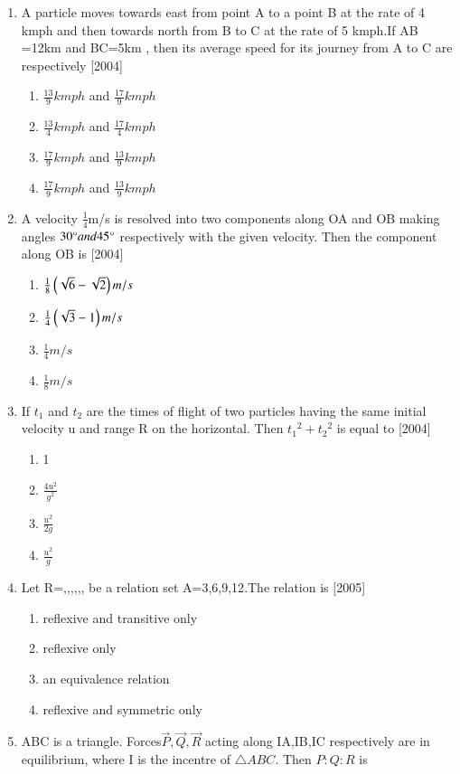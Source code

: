 \documentclass[journal,12pt,twocolumn]{IEEEtran}
\theoremstyle{remark}
\begin{document}
\begin{enumerate}[start=16]
\item A particle moves towards east from point A to a point B at the rate of 4 kmph and then towards north from B to C at the rate of 5 kmph.If AB =12km and BC=5km , then its average speed for its journey from A to C are respectively
\hfill{[2004]}
\begin{enumerate}
\item $\frac{13}{9}kmph$ and $\frac{17}{9}kmph$
\item $\frac{13}{4}kmph$ and $\frac{17}{4}kmph$
\item $\frac{17}{9}kmph$ and $\frac{13}{9}kmph$
\item $\frac{17}{9}kmph$ and $\frac{13}{9}kmph$
\end{enumerate}
\item A velocity $\frac{1}{4}$m/s is resolved into two components along OA and OB making angles $30\degree and 45\degree$ respectively with the given velocity. Then the component along OB is
\hfill{[2004]}
\begin{enumerate}
\item $\frac{1}{8}\left(\sqrt{6}-\sqrt{2}\right)m/s$
\item $\frac{1}{4}\left(\sqrt{3}-1\right)m/s$
\item $\frac{1}{4} m/s$
\item $\frac{1}{8} m/s$
\end{enumerate}
\item If $t_1$ and $t_2$ are the times of flight of two particles having the same initial velocity u and range R on the horizontal. Then $ {t_1}^2 + {t_2}^2$ is equal to
\hfill{[2004]}
\begin{enumerate}
\item 1
\item $\frac{4{u}^2}{{g}^2}$
\item $\frac{{u}^2}{2g}$
\item $\frac{{u}^2}{g}$
\end{enumerate}
\item
Let R={,,,,,,} be a relation set A={3,6,9,12}.The relation is
\hfill{[2005]}
\begin{enumerate}
\item reflexive and transitive only
\item reflexive only
\item an equivalence relation
\item reflexive and symmetric only
\end{enumerate}
\item ABC is a triangle. Forces$\vec{P},\vec{Q},\vec{R}$ acting along IA,IB,IC respectively are in equilibrium, where I is the incentre of $\triangle ABC$. Then $P\colon Q \colon R$ is

\end{enumerate}
\end{document}
